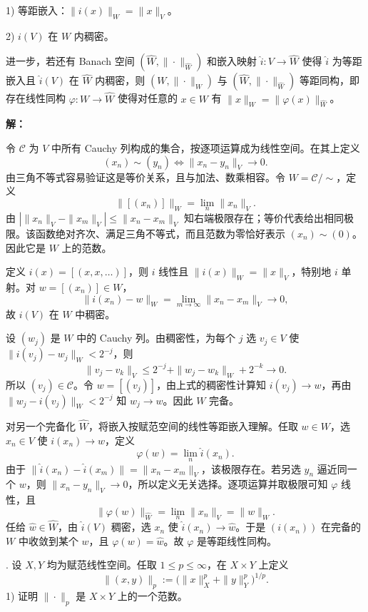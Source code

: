 \documentclass{article}
\begin{document}
1) 等距嵌入：$\|i(x)\|_W=\|x\|_V$。

2) $i(V)$ 在 $W$ 内稠密。

进一步，若还有 Banach 空间 $(\widehat W,\|\cdot\|_{\widehat W})$ 和嵌入映射 $\widehat i:V\to\widehat W$ 使得 $\widehat i$ 为等距嵌入且 $\widehat i(V)$ 在 $\widehat W$ 内稠密，则 $(W,\|\cdot\|_W)$ 与 $(\widehat W,\|\cdot\|_{\widehat W})$ 等距同构，即存在线性同构 $\varphi:W\to\widehat W$ 使得对任意的 $x\in W$ 有 $\|x\|_W=\|\varphi(x)\|_{\widehat W}$。


\par{}\noindent\textbf{解：}\par\nopagebreak[4]



令 $\mathcal C$ 为 $V$ 中所有 Cauchy 列构成的集合，按逐项运算成为线性空间。在其上定义
\[
(x_n)\sim(y_n)\iff\|x_n-y_n\|_V\to0.
\]
由三角不等式容易验证这是等价关系，且与加法、数乘相容。令 $W=\mathcal C/{\sim}$，定义
\[
\|[(x_n)]\|_W=\lim_n\|x_n\|_V.
\]
由 $|\|x_n\|_V-\|x_m\|_V|\le\|x_n-x_m\|_V$ 知右端极限存在；等价代表给出相同极限。该函数绝对齐次、满足三角不等式，而且范数为零恰好表示 $(x_n)\sim(0)$。因此它是 $W$ 上的范数。

定义 $i(x)=[(x,x,\ldots)]$，则 $i$ 线性且 $\|i(x)\|_W=\|x\|_V$，特别地 $i$ 单射。对 $w=[(x_n)]\in W$，
\[
\|i(x_n)-w\|_W=\lim_{m\to\infty}\|x_n-x_m\|_V\longrightarrow0,
\]
故 $i(V)$ 在 $W$ 中稠密。

设 $(w_j)$ 是 $W$ 中的 Cauchy 列。由稠密性，为每个 $j$ 选 $v_j\in V$ 使 $\|i(v_j)-w_j\|_W<2^{-j}$，则
\[
\|v_j-v_k\|_V\le2^{-j}+\|w_j-w_k\|_W+2^{-k}\longrightarrow0.
\]
所以 $(v_j)\in\mathcal C$。令 $w=[(v_j)]$，由上式的稠密性计算知 $i(v_j)\to w$，再由 $\|w_j-i(v_j)\|_W<2^{-j}$ 知 $w_j\to w$。因此 $W$ 完备。

对另一个完备化 $\widehat W$，将嵌入按赋范空间的线性等距嵌入理解。任取 $w\in W$，选 $x_n\in V$ 使 $i(x_n)\to w$，定义
\[
\varphi(w)=\lim_n\widehat i(x_n).
\]
由于 $\|\widehat i(x_n)-\widehat i(x_m)\|=\|x_n-x_m\|_V$，该极限存在。若另选 $y_n$ 逼近同一个 $w$，则 $\|x_n-y_n\|_V\to0$，所以定义无关选择。逐项运算并取极限可知 $\varphi$ 线性，且
\[
\|\varphi(w)\|_{\widehat W}=\lim_n\|x_n\|_V=\|w\|_W.
\]
任给 $\widehat w\in\widehat W$，由 $\widehat i(V)$ 稠密，选 $x_n$ 使 $\widehat i(x_n)\to\widehat w$。于是 $(i(x_n))$ 在完备的 $W$ 中收敛到某个 $w$，且 $\varphi(w)=\widehat w$。故 $\varphi$ 是等距线性同构。


\par\medskip{}. 设 $X,Y$ 均为赋范线性空间。任取 $1\le p\le\infty$，在 $X\times Y$ 上定义
\[
\|(x,y)\|_p:=\bigl(\|x\|_X^p+\|y\|_Y^p\bigr)^{1/p}.
\]
1) 证明 $\|\cdot\|_p$ 是 $X\times Y$ 上的一个范数。
\end{document}
